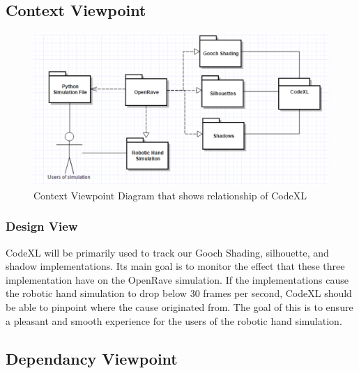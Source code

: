 \documentclass[10pt,journal,compsoc,draftclsnofoot]{IEEEtran}
\begin{document}
\begin{flushleft}
\subsection{Context Viewpoint}

\begin{figure} [H]
  \includegraphics[scale=0.9]{CodeXL_Context.eps}
  \caption
{ \newline \hspace{\linewidth}
Context Viewpoint Diagram that shows relationship of CodeXL}
  \label{fig:CodeXL_Context}
\end{figure}

\subsubsection{Design View}
CodeXL will be primarily used to track our Gooch Shading, silhouette, and shadow implementations.
Its main goal is to monitor the effect that these three implementation have on the OpenRave simulation.
If the implementations cause the robotic hand simulation to drop below 30 frames per second, CodeXL should be able to pinpoint where the cause originated from.
The goal of this is to ensure a pleasant and smooth experience for the users of the robotic hand simulation.

\subsection{Dependancy Viewpoint}


\end{flushleft}
\end{document}
